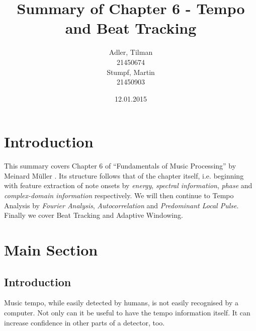 \documentclass[a4paper, 9pt, twocolumn]{extarticle}
\begin{document}
\date{\normalsize 12.01.2015}

\title{\vspace{-8mm}\textbf{\Large
Summary of Chapter 6 - Tempo and Beat Tracking
}}

\author{
%
\begin{minipage}{0.4\textwidth}
\center
Adler, Tilman\\21450674
\end{minipage}
%
\begin{minipage}{0.4\textwidth}
\center
Stumpf, Martin\\21450903
\end{minipage}
}


\maketitle
\thispagestyle{empty}

\section{Introduction}
\label{section:introduction}

This summary covers Chapter 6 of ``Fundamentals of Music Processing'' by Meinard M\"uller
\cite{Mueller15_FundamentalsMusicProcessig_SPRINGER}.
Its structure follows that of the chapter itself, i.e. beginning with feature extraction
of note onsets by \emph{energy}, \emph{spectral information}, \emph{phase} and
\emph{complex-domain information} respectively. We will then continue to Tempo Analysis
by \emph{Fourier Analysis}, \emph{Autocorrelation} and \emph{Predominant Local Pulse}.
Finally we cover Beat Tracking and Adaptive Windowing.



\section{Main Section}
\label{section:main}

\subsection{Introduction}
Music tempo, while easily detected by humans, is not easily recognised by a computer.
Not only can it be useful to have the tempo information itself. It can increase confidence
in other parts of a detector, too.
\end{document}
